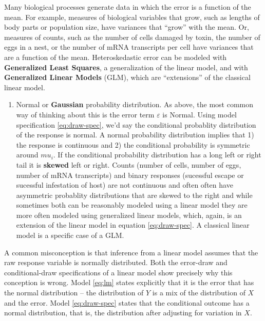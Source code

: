 \documentclass[]{book}
\providecommand{\tightlist}{%
  \setlength{\itemsep}{0pt}\setlength{\parskip}{0pt}}
\begin{document}
Many biological processes generate data in which the error is a function of the mean. For example, measures of biological variables that grow, such as lengths of body parts or population size, have variances that ``grow'' with the mean. Or, measures of counts, such as the number of cells damaged by toxin, the number of eggs in a nest, or the number of mRNA transcripts per cell have variances that are a function of the mean. Heteroskedastic error can be modeled with \textbf{Generalized Least Squares}, a generalization of the linear model, and with \textbf{Generalized Linear Models} (GLM), which are ``extensions'' of the classical linear model.

\begin{enumerate}
\def\labelenumi{\arabic{enumi}.}
\setcounter{enumi}{1}
\tightlist
\item
  Normal or \textbf{Gaussian} probability distribution. As above, the most common way of thinking about this is the error term \(\varepsilon\) is Normal. Using model specification \eqref{eq:draw-spec}, we'd say the conditional probablity distribution of the response is normal. A normal probability distribution implies that 1) the response is continuous and 2) the conditional probability is symmetric around \(mu_i\). If the conditional probability distribution has a long left or right tail it is \textbf{skewed} left or right. Counts (number of cells, number of eggs, number of mRNA transcripts) and binary responses (sucessful escape or sucessful infestation of host) are not continuous and often often have asymmetric probablity distributions that are skewed to the right and while sometimes both can be reasonably modeled using a linear model they are more often modeled using generalized linear models, which, again, is an extension of the linear model in equation \eqref{eq:draw-spec}. A classical linear model is a specific case of a GLM.
\end{enumerate}

A common misconception is that inference from a linear model assumes that the raw response variable is normally distributed. Both the error-draw and conditional-draw specifications of a linear model show precisely why this conception is wrong. Model \eqref{eq:lm} states explicitly that it is the error that has the normal distribution -- the distribution of \(Y\) is a mix of the distribution of \(X\) and the error. Model \eqref{eq:draw-spec} states that the conditional outcome has a normal distribution, that is, the distribution after adjusting for variation in \(X\).
\end{document}
